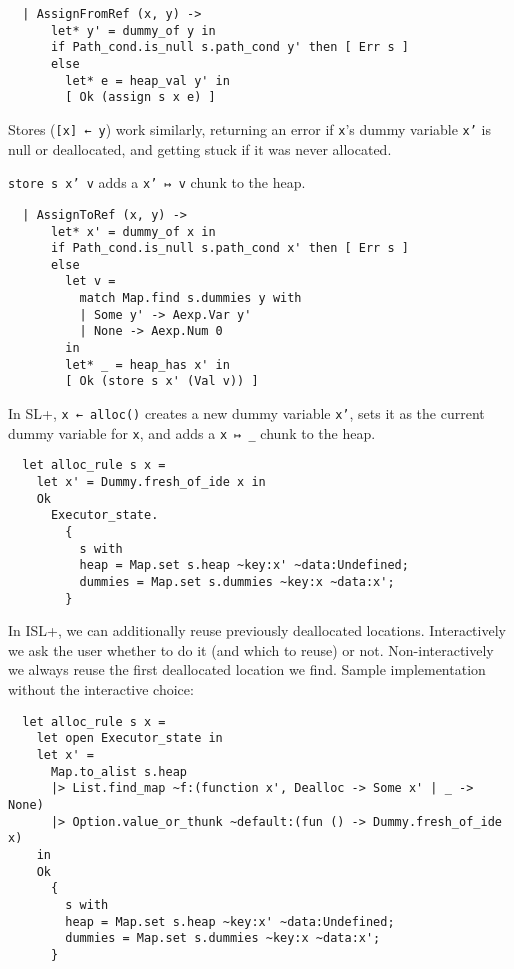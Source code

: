 \documentclass[parskip=half]{scrartcl}
\begin{document}
\begin{verbatim}
  | AssignFromRef (x, y) ->
      let* y' = dummy_of y in
      if Path_cond.is_null s.path_cond y' then [ Err s ]
      else
        let* e = heap_val y' in
        [ Ok (assign s x e) ]
\end{verbatim}


Stores (\texttt{[x] ← y}) work similarly, returning an error if \texttt{x}'s dummy variable \texttt{x'} is null or deallocated, and getting stuck if it was never allocated.

\texttt{store s x' v} adds a \texttt{x' ↦ v} chunk to the heap.

\begin{verbatim}
  | AssignToRef (x, y) ->
      let* x' = dummy_of x in
      if Path_cond.is_null s.path_cond x' then [ Err s ]
      else
        let v =
          match Map.find s.dummies y with
          | Some y' -> Aexp.Var y'
          | None -> Aexp.Num 0
        in
        let* _ = heap_has x' in
        [ Ok (store s x' (Val v)) ]
\end{verbatim}


In SL+, \texttt{x ← alloc()} creates a new dummy variable \texttt{x'}, sets it as the current dummy variable for \texttt{x}, and adds a \texttt{x ↦ \_} chunk to the heap.

\begin{verbatim}
  let alloc_rule s x =
    let x' = Dummy.fresh_of_ide x in
    Ok
      Executor_state.
        {
          s with
          heap = Map.set s.heap ~key:x' ~data:Undefined;
          dummies = Map.set s.dummies ~key:x ~data:x';
        }
\end{verbatim}

In ISL+, we can additionally reuse previously deallocated locations. Interactively we ask the user whether to do it (and which to reuse) or not. Non-interactively we always reuse the first deallocated location we find. Sample implementation without the interactive choice:

\begin{verbatim}
  let alloc_rule s x =
    let open Executor_state in
    let x' =
      Map.to_alist s.heap
      |> List.find_map ~f:(function x', Dealloc -> Some x' | _ -> None)
      |> Option.value_or_thunk ~default:(fun () -> Dummy.fresh_of_ide x)
    in
    Ok
      {
        s with
        heap = Map.set s.heap ~key:x' ~data:Undefined;
        dummies = Map.set s.dummies ~key:x ~data:x';
      }
\end{verbatim}
\end{document}
